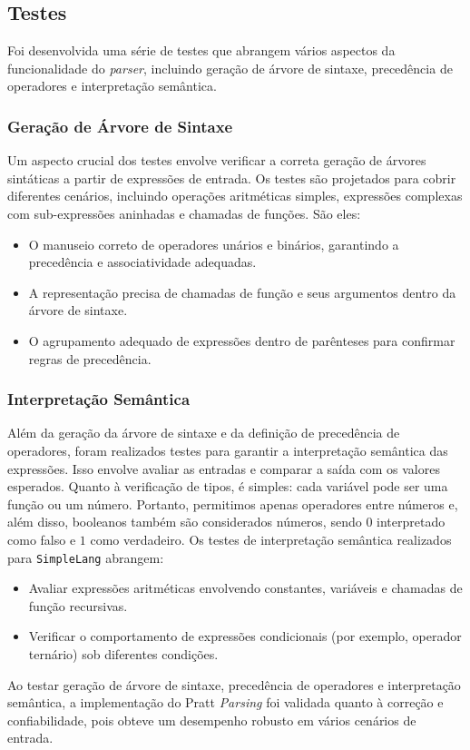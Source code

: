 \subsection{Testes}


Foi desenvolvida uma série de testes que  abrangem vários aspectos da funcionalidade do \textit{parser}, incluindo geração de árvore de sintaxe, precedência de operadores e interpretação semântica.


\subsubsection{Geração de Árvore de Sintaxe}


Um aspecto crucial dos testes envolve verificar a correta geração de árvores sintáticas a partir de expressões de entrada. Os testes são projetados para cobrir diferentes cenários, incluindo operações aritméticas simples, expressões complexas com sub-expressões aninhadas e chamadas de funções. São eles:


\begin{itemize}
    \item O manuseio correto de operadores unários e binários, garantindo a precedência e associatividade adequadas.
    \item A representação precisa de chamadas de função e seus argumentos dentro da árvore de sintaxe.
    \item O agrupamento adequado de expressões dentro de parênteses para confirmar regras de precedência.
\end{itemize}

\subsubsection{Interpretação Semântica}

Além da geração da árvore de sintaxe e da definição de precedência de operadores, foram realizados testes para garantir a interpretação semântica das expressões. Isso envolve avaliar as entradas e comparar a saída com os valores esperados. Quanto à verificação de tipos, é simples: cada variável pode ser uma função ou um número. Portanto, permitimos apenas operadores entre números e, além disso, booleanos também são considerados números, sendo $0$ interpretado como falso e $1$ como verdadeiro. Os testes de interpretação semântica realizados para \texttt{SimpleLang} abrangem:


\begin{itemize}
    \item Avaliar expressões aritméticas envolvendo constantes, variáveis e chamadas de função recursivas.
    \item Verificar o comportamento de expressões condicionais (por exemplo, operador ternário) sob diferentes condições.
\end{itemize}


Ao testar geração de árvore de sintaxe, precedência de operadores e interpretação semântica, a implementação do Pratt \textit{Parsing} foi validada quanto à correção e confiabilidade, pois obteve um desempenho robusto em vários cenários de entrada.

